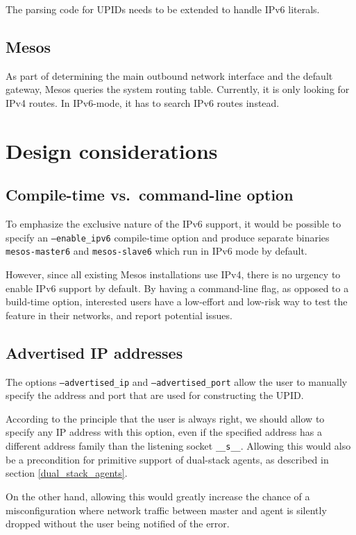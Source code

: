 \documentclass{scrreprt}
\begin{document}
The parsing code for UPIDs needs to be extended to handle IPv6 literals.


\subsection{Mesos}
As part of determining the main outbound network interface and the default gateway,
Mesos queries the system routing table. Currently, it is only looking for IPv4 routes.
In IPv6-mode, it has to search IPv6 routes instead.




\section{Design considerations}
\subsection{Compile-time vs.\ command-line option}
To emphasize the exclusive nature of the IPv6 support, it would be possible to
specify an \texttt{--enable\_ipv6} compile-time option and produce separate binaries
\texttt{mesos-master6} and \texttt{mesos-slave6} which run in IPv6 mode by default.

However, since all existing Mesos installations use IPv4, there is no urgency to enable
IPv6 support by default. By having a command-line flag, as opposed to a
build-time option, interested users have a low-effort and low-risk way to test
the feature in their networks, and report potential issues.


\subsection{Advertised IP addresses}
The options \texttt{--advertised\_ip} and \texttt{--advertised\_port} allow the
user to manually specify the address and port that are used for constructing the UPID.

According to the principle that the user is always right, we should
allow to specify any IP address with this option, even if the specified
address has a different address family than the listening socket \texttt{\_\_s\_\_}.
Allowing this would also be a precondition for primitive support of
dual-stack agents, as described in section \ref{dual_stack_agents}.

On the other hand, allowing this would greatly increase the chance of
a misconfiguration where network traffic between master and agent is
silently dropped without the user being notified of the error.
\end{document}
